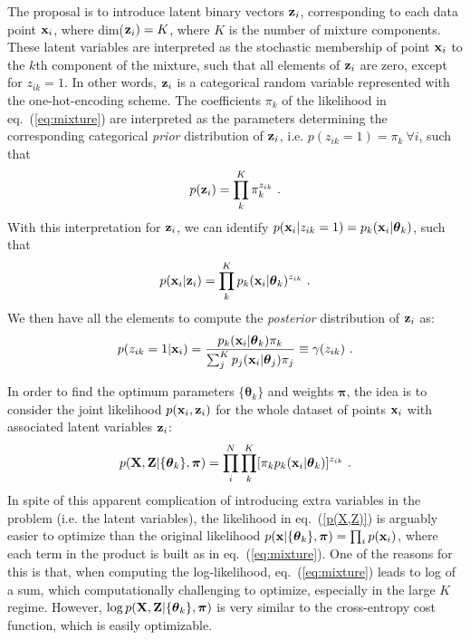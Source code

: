 \documentclass[12pt, a4paper]{article}
\newcommand{\bx}{{\bf x}}
\newcommand{\btheta}{\boldsymbol{\theta}}
\begin{document}
The proposal is to introduce latent binary vectors ${\bf z}_i$, corresponding to each data point $\bx_i$, where dim(${\bf z}_i)=K$, where $K$ is the number of mixture components. These latent variables are interpreted as the stochastic membership of point $\bx_i$ to the $k$th component of the mixture, such that all elements of ${\bf z}_i$ are zero, except for $z_{ik}=1$. In other words, ${\bf z}_i$ is a categorical random variable represented with the one-hot-encoding scheme. The coefficients $\pi_k$ of the likelihood in eq.~(\ref{eq:mixture}) are interpreted as the parameters determining the corresponding categorical {\it prior} distribution of ${\bf z}_i$, i.e. $p(z_{ik}=1)=\pi_k~\forall i$, such that  
\begin{equation}
 p({\bf z}_i) = \prod_k^K \pi_k^{z_{ik}} ~.  
\end{equation}
With this interpretation for ${\bf z}_i$, we can identify $ p(\bx_i | z_{ik}=1) = p_k(\bx_i|\btheta_k)$, such that
\begin{equation}
p(\bx_i|{\bf z}_i) = \prod_k^K p_k(\bx_i|\btheta_k)^{z_{ik}}~.
\end{equation}
We then have all the elements to compute the {\it posterior} distribution of ${\bf z}_i$ as:
\begin{equation}
p(z_{ik}=1 | \bx_i) = \frac{p_k(\bx_i|\btheta_k) \pi_k}
{\sum_j^K p_j(\bx_i|\btheta_j) \pi_j} \equiv \gamma(z_{ik})~.
\label{gamma}
\end{equation}

In order to find the optimum parameters $\{\btheta_k\}$ and weights $\boldsymbol{\pi}$, the idea is to consider the joint likelihood $p(\bx_i, {\bf z}_i)$ 
for the whole dataset of points $\bx_i$ with associated latent variables ${\bf z}_i$:
\begin{equation}
\label{p(X,Z)}
p({\bf X,Z}|\{\btheta_k\},\boldsymbol{\pi})
=\prod_i^N \prod_k^K [\pi_k p_k(\bx_i|\btheta_k)]^{z_{ik}}~.
\end{equation}
In spite of this apparent complication of introducing extra variables in the problem (i.e. the latent variables), the likelihood in eq.~(\ref{p(X,Z)}) is arguably easier to optimize than the original likelihood $p(\bx|\{\btheta_k\},\boldsymbol{\pi}) = \prod_i p(\bx_i)$, where each term in the product is built as in eq.~(\ref{eq:mixture}). One of the reasons for this is that, when computing the log-likelihood, eq.~(\ref{eq:mixture}) leads to log of a sum, which computationally challenging to optimize, especially in the large $K$ regime. However, $\log p({\bf X,Z}|\{\btheta_k\},\boldsymbol{\pi})$ is very similar to the cross-entropy cost function, which is easily optimizable.  
\end{document}

